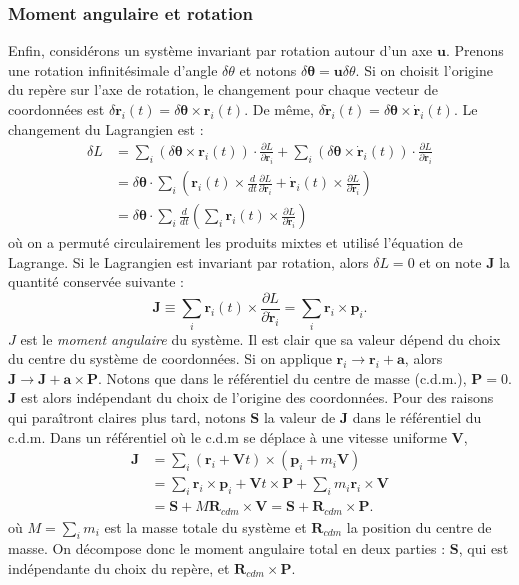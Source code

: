 \subsubsection{Moment angulaire et rotation}
Enfin, considérons un système invariant par rotation autour d'un axe $\bm{u}$. Prenons une rotation infinitésimale d'angle $\delta\theta$ et notons $\delta\bm{\theta}=\bm{u}\delta\theta$. Si on choisit l'origine du repère sur l'axe de rotation, le changement pour chaque vecteur de coordonnées est $\delta\bm{r}_i(t) = \delta\bm{\theta}\times\bm{r}_i(t)$. De même, $\delta\bm{\dot{r}}_i(t) = \delta\bm{\theta}\times\bm{\dot{r}}_i(t)$. Le changement du Lagrangien est :
\begin{align*}
\delta L &=\sum_i \left(\delta\bm{\theta}\times\bm{r}_i(t)\right)\cdot\frac{\partial L}{\partial \bm{r}_i}+\sum_i \left(\delta\bm{\theta}\times\bm{\dot{r}}_i(t)\right)\cdot\frac{\partial L}{\partial \bm{\dot{r}}_i}\\
&=\delta\bm{\theta}\cdot\sum_i\left(\bm{r}_i(t)\times\frac{d}{dt}\frac{\partial L}{\partial {\dot{\bm{r}}}_i}
+\bm{\dot{r}}_i(t)\times\frac{\partial L}{\partial \bm{\dot{r}}_i}\right)\\
&=\delta\bm{\theta}\cdot\sum_i\frac{d}{dt}\left(\sum_i \bm{r}_i(t)\times\frac{\partial L}{\partial \bm{\dot{r}}_i}\right)
\end{align*}
où on a permuté circulairement les produits mixtes et utilisé l'équation de Lagrange. Si le Lagrangien est invariant par rotation, alors $\delta L = 0$ et on note $\bm{J}$ la quantité conservée suivante :
\begin{equation}
\bm{J}\equiv\sum_i \bm{r}_i(t)\times\frac{\partial L}{\partial \bm{\dot{r}}_i}=\sum_i \bm{r}_i\times\bm{p}_i.
\label{eq:defJ}
\end{equation}
$J$ est le \textit{moment angulaire} du système. Il est clair que sa valeur dépend du choix du centre du système de coordonnées. Si on applique $\bm{r}_i\rightarrow \bm{r}_i+\bm{a}$, alors $\bm{J}\rightarrow \bm{J}+\bm{a}\times\bm{P}$. Notons que dans le référentiel du centre de masse (c.d.m.), $\bm{P}=0$. $\bm{J}$ est alors indépendant du choix de l'origine des coordonnées. Pour des raisons qui paraîtront claires plus tard, notons $\bm{S}$ la valeur de $\bm{J}$ dans le référentiel du c.d.m. Dans un référentiel où le c.d.m se déplace à une vitesse uniforme $\bm{V}$, 
\begin{align*}
\bm{J}&=\sum_i \left(\bm{r}_i+\bm{V}t\right)\times\left(\bm{p}_i+m_i\bm{V}\right)\\
&= \sum_i\bm{r}_i\times\bm{p}_i+\bm{V}t\times\bm{P}+\sum_i m_i\bm{r}_i\times\bm{V} \\
&= \bm{S} + M \bm{R}_{cdm}\times\bm{V} = \bm{S} + \bm{R}_{cdm}\times\bm{P}.
\end{align*}
où $M=\sum_i m_i$ est la masse totale du système et $\bm{R}_{cdm}$ la position du centre de masse. On décompose donc le moment angulaire total en deux parties : $\bm{S}$, qui est indépendante du choix du repère, et $\bm{R}_{cdm}\times\bm{P}$.

